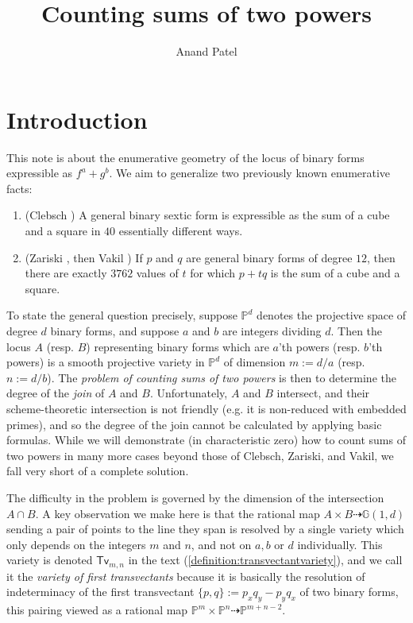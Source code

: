 \documentclass[12pt]{article}
\author{Anand Patel}
\title{Counting sums of two powers}
\theoremstyle{plain}
\theoremstyle{remark}
\renewcommand{\P}{\mathbb{P}}
\newcommand{\G}{\mathbb{G}}
\newcommand{\transvectant}{\mathsf{Tv}}
\begin{document}
\maketitle

\section{Introduction}


This note is about the enumerative geometry of the locus of binary forms expressible as $f^{a} + g^{b}$.  We aim to generalize two previously known enumerative facts:
\begin{enumerate}
    \item[(I)] (Clebsch \cite{clebsch1870theorie}) A general binary sextic form is expressible as the sum of a cube and a square in $40$ essentially different ways.
    \item[(II)] (Zariski \cite{zariski1928hyperelliptic}, then Vakil \cite{vakil2001twelve}) If $p$ and $q$ are general binary forms of degree $12$, then there are exactly $3762$ values of $t$ for which $p + t q$ is the sum of a cube and a square.
\end{enumerate}

To state the general question precisely, suppose $\P^{d}$ denotes the projective space of degree $d$ binary forms, and suppose $a$ and $b$ are integers dividing $d$. Then the locus $A$ (resp. $B$) representing binary forms which are $a$'th powers (resp. $b$'th powers) is a smooth projective variety in $\P^{d}$ of dimension $m := d/a$ (resp. $n := d/b$).  The {\sl problem of  counting sums of two powers} is then to determine the degree of the {\sl join} of $A$ and $B$.  Unfortunately, $A$ and $B$ intersect, and their scheme-theoretic intersection is not friendly (e.g. it is non-reduced with embedded primes), and so the degree of the join cannot be calculated by applying basic formulas.  While we will demonstrate (in characteristic zero) how to count sums of two powers in many more cases beyond those of Clebsch, Zariski, and Vakil, we fall very short of a complete solution.

The difficulty in the problem is governed by the dimension of the intersection $A \cap B$.  A key observation we make here is that the rational map $A \times B \dashrightarrow \G(1,d)$ sending a pair of points to the line they span is resolved by a single variety which only depends on the integers $m$ and $n$, and not on $a, b$ or $d$ individually.  This variety is denoted $\transvectant_{m,n}$ in the text (\ref{definition:transvectantvariety}), and we call it the {\sl variety of first transvectants} because it is basically the resolution of indeterminacy of the first transvectant $\{p,q\} := p_{x}q_{y} - p_{y}q_{x}$ of two binary forms, this pairing viewed as a rational map $\P^{m} \times \P^{n} \dashrightarrow \P^{m+n-2}$.
\end{document}
